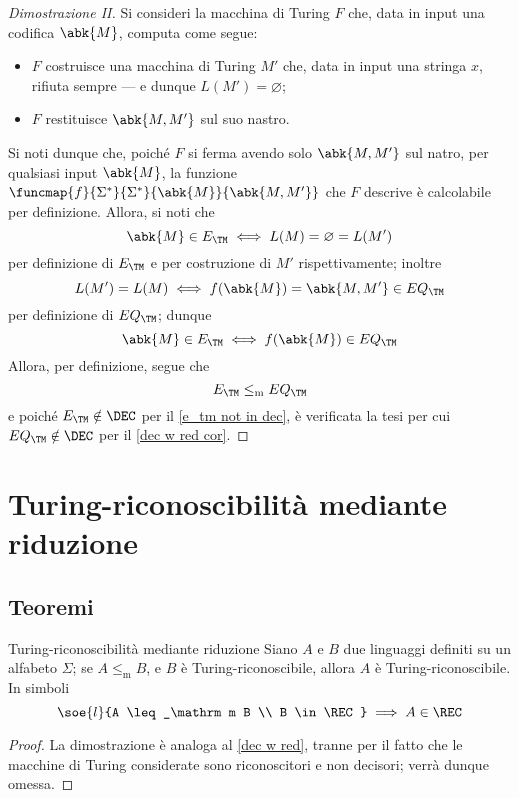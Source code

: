 \documentclass[a4paper, 12pt]{report}
\begin{document}
    \begin{proof}[Dimostrazione II]
        Si consideri la macchina di Turing $F$ che, data in input una codifica $\abk{M}$, computa come segue:

        \begin{itemize}
            \item $F$ costruisce una macchina di Turing $M'$ che, data in input una stringa $x$, rifiuta sempre --- e dunque $L(M') = \varnothing$;
            \item $F$ restituisce $\abk{M, M'}$ sul suo nastro.
        \end{itemize}
        
        Si noti dunque che, poiché $F$ si ferma avendo solo $\abk{M, M'}$ sul natro, per qualsiasi input $\abk{M}$, la funzione $\funcmap{f}{\Sigma^*}{\Sigma^*}{\abk{M}}{\abk{M, M'}}$ che $F$ descrive è calcolabile per definizione. Allora, si noti che $$\abk{M} \in E_\TM \iff L(M) = \varnothing = L(M')$$ per definizione di $E_\TM$ e per costruzione di $M'$ rispettivamente; inoltre $$L(M') = L(M) \iff f(\abk{M}) = \abk{M, M'} \in EQ_\TM$$ per definizione di $EQ_\TM$; dunque $$\abk{M} \in E_\TM \iff f(\abk{M}) \in EQ_\TM $$ Allora, per definizione, segue che $$E_\TM \leq_\mathrm m EQ_\TM$$ e poiché $E_\TM \notin \DEC$ per il \cref{e_tm not in dec}, è verificata la tesi per cui $EQ_\TM \notin \DEC$ per il \cref{dec w red cor}.
    \end{proof}

    \section{Turing-riconoscibilità mediante riduzione}

    \subsection{Teoremi}

    \begin{framedthm}[label={rec w red}]{Turing-riconoscibilità mediante riduzione}
        Siano $A$ e $B$ due linguaggi definiti su un alfabeto $\Sigma$; se $A \leq_\mathrm m B$, e $B$ è Turing-riconoscibile, allora $A$ è Turing-riconoscibile. In simboli $$\soe{l}{A \leq_\mathrm m B \\ B \in \REC} \implies A \in \REC$$
    \end{framedthm}

    \begin{proof}
        La dimostrazione è analoga al \cref{dec w red}, tranne per il fatto che le macchine di Turing considerate sono riconoscitori e non decisori; verrà dunque omessa.
    \end{proof}
\end{document}
